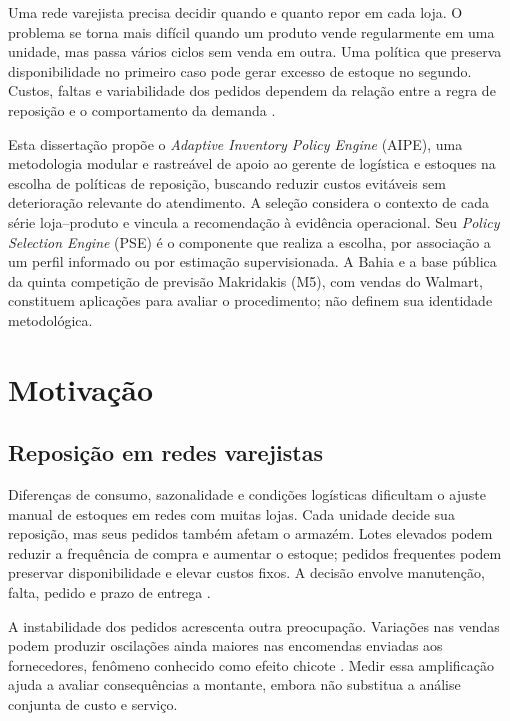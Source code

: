 
Uma rede varejista precisa decidir quando e quanto repor em cada loja. O problema se torna mais difícil quando um produto vende regularmente em uma unidade, mas passa vários ciclos sem venda em outra. Uma política que preserva disponibilidade no primeiro caso pode gerar excesso de estoque no segundo. Custos, faltas e variabilidade dos pedidos dependem da relação entre a regra de reposição e o comportamento da demanda \citep{Axsater2006InventoryControl,Syntetos2005Categorization}.

Esta dissertação propõe o \textit{Adaptive Inventory Policy Engine} (AIPE), uma metodologia modular e rastreável de apoio ao gerente de logística e estoques na escolha de políticas de reposição, buscando reduzir custos evitáveis sem deterioração relevante do atendimento. A seleção considera o contexto de cada série loja--produto e vincula a recomendação à evidência operacional. Seu \textit{Policy Selection Engine} (PSE) é o componente que realiza a escolha, por associação a um perfil informado ou por estimação supervisionada. A Bahia e a base pública da quinta competição de previsão Makridakis (M5), com vendas do Walmart, constituem aplicações para avaliar o procedimento; não definem sua identidade metodológica.

\section{Motivação}

\subsection{Reposição em redes varejistas}

Diferenças de consumo, sazonalidade e condições logísticas dificultam o ajuste manual de estoques em redes com muitas lojas. Cada unidade decide sua reposição, mas seus pedidos também afetam o armazém. Lotes elevados podem reduzir a frequência de compra e aumentar o estoque; pedidos frequentes podem preservar disponibilidade e elevar custos fixos. A decisão envolve manutenção, falta, pedido e prazo de entrega \citep{Axsater2006InventoryControl,Zipkin2000FoundationsInventory}.

A instabilidade dos pedidos acrescenta outra preocupação. Variações nas vendas podem produzir oscilações ainda maiores nas encomendas enviadas aos fornecedores, fenômeno conhecido como efeito chicote \citep{LeePadmanabhanWhang1997Bullwhip}. Medir essa amplificação ajuda a avaliar consequências a montante, embora não substitua a análise conjunta de custo e serviço.

